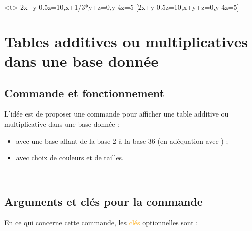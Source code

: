 \documentclass[french,a4paper,11pt]{article}
\newcommand\Cle[1]{{\small\sffamily\textlangle \textcolor{orange}{#1}\textrangle}}
\begin{document}
{{\begin{DemoCode}[]
\ResolSystemeMatrices[Enonce=false,Dense]<t>%
	{2x+y-0.5z=10,x+1/3*y+z=0,y-4z=5}%
	[2x+y-{\num{0.5}}z=10,x+{}y+z=0,y-4z=5]%
\end{DemoCode}

\pagebreak

\section{Tables additives ou multiplicatives dans une base donnée}

\subsection{Commande et fonctionnement}

\begin{cautionblock}
L'idée est de proposer une commande pour afficher une table additive ou multiplicative dans une base donnée :

\begin{itemize}
	\item avec une base allant de la base 2 à la base 36 (en adéquation avec ) ;
	\item avec choix de couleurs et de tailles.
\end{itemize}
\vspace*{-\baselineskip}\leavevmode
\end{cautionblock}

\begin{DemoCode}
\end{DemoCode}

\begin{DemoCode}[]
~~
\end{DemoCode}

\subsection{Arguments et clés pour la commande}

\begin{tipblock}
En ce qui concerne cette commande, les \Cle{clés} optionnelles sont :


\end{tipblock}}}
\end{document}
